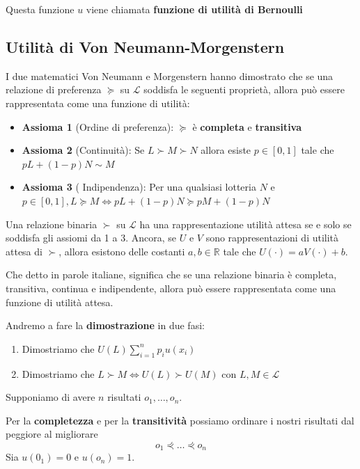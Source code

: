 Questa funzione $u$ viene chiamata \textbf{funzione di utilità di Bernoulli}

\subsection{Utilità di Von Neumann-Morgenstern}

I due matematici Von Neumann e Morgenstern hanno dimostrato che se una
relazione di preferenza $\succcurlyeq$ su $\mathcal{L}$ soddisfa le seguenti
proprietà, allora può essere rappresentata come una funzione di utilità:
\begin{itemize}
    \item \textbf{Assioma 1} (Ordine di preferenza): $\succcurlyeq$ è \textbf{completa} e \textbf{transitiva}
    \item \textbf{Assioma 2} (Continuità): Se $L \succ M \succ N$ allora esiste $p \in [0,1]$ tale che $pL + (1-p)N \sim M$
    \item \textbf{Assioma 3} ( Indipendenza): Per una qualsiasi lotteria $N$ e $p \in [0,1], L \succcurlyeq M \iff pL + (1-p)N \succcurlyeq pM + (1-p)N$
\end{itemize}

\begin{theorem}
    Una relazione binaria $\succ$ su $\mathcal{L}$ ha una rappresentazione utilità attesa se e solo se soddisfa gli assiomi da 1 a 3. Ancora, se $U$ e $V$ sono
    rappresentazioni di utilità attesa di $\succ$, allora esistono delle costanti $a,b \in \mathbb{R}$ tale che $U(\cdot) = aV(\cdot)+b$.
\end{theorem}

Che detto in parole italiane, significa che se una relazione binaria è
completa, transitiva, continua e indipendente, allora può essere rappresentata
come una funzione di utilità attesa.

Andremo a fare la \textbf{dimostrazione} in due fasi:
\begin{enumerate}
    \item Dimostriamo che $U(L) \sum_{i=1}^n p_i u(x_i)$
    \item Dimostriamo che $L \succ M \iff U(L) \succ U(M)$ con $L,M \in \mathcal{L}$
\end{enumerate}

\begin{dimostrazione}
\end{dimostrazione}
Supponiamo di avere $n$ risultati $o_1, \dots, o_n$.

Per la \textbf{completezza} e per la \textbf{transitività} possiamo ordinare i
nostri risultati dal peggiore al migliorare
\[
    o_1 \curlyeqprec \dots \curlyeqprec o_n
\]
Sia $u(0_1) = 0$ e $u(o_n) = 1$.

